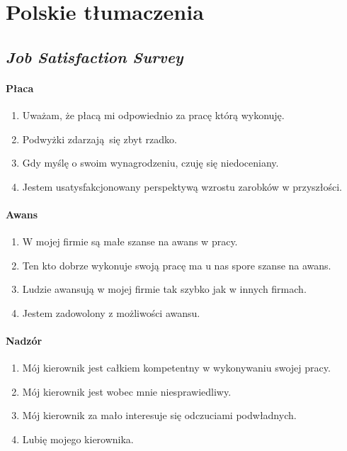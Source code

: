 \appendix
\section{Polskie tłumaczenia}

\subsection{\emph{Job Satisfaction Survey}}
\label{sec:jss-text}
\paragraph{Płaca}
\begin{enumerate}
  \item Uważam, że płacą mi odpowiednio za pracę którą wykonuję.
  \item Podwyżki zdarzają się zbyt rzadko.
  \item Gdy myślę o swoim wynagrodzeniu, czuję się niedoceniany.
  \item Jestem usatysfakcjonowany perspektywą wzrostu zarobków w przyszłości.
\end{enumerate}

\paragraph{Awans}
\begin{enumerate}
  \item W mojej firmie są małe szanse na awans w pracy.
  \item Ten kto dobrze wykonuje swoją pracę ma u nas spore szanse na awans.
  \item Ludzie awansują w mojej firmie tak szybko jak w innych firmach.
  \item Jestem zadowolony z możliwości awansu.
\end{enumerate}

\paragraph{Nadzór}
\begin{enumerate}
  \item Mój kierownik jest całkiem kompetentny w wykonywaniu swojej pracy.
  \item Mój kierownik jest wobec mnie niesprawiedliwy.
  \item Mój kierownik za mało interesuje się odczuciami podwładnych.
  \item Lubię mojego kierownika.
\end{enumerate}

